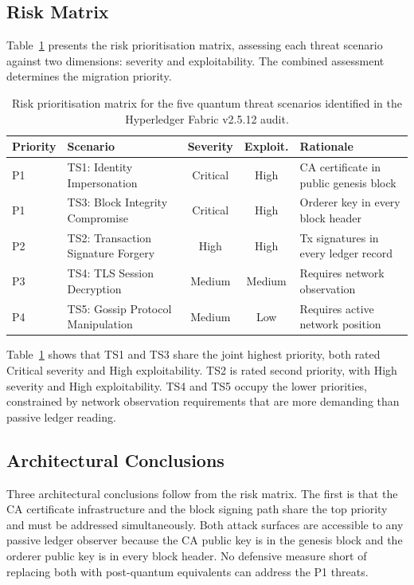 \documentclass[conference]{IEEEtran}
\begin{document}
\subsection{Risk Matrix}

Table~\ref{tab:risk_matrix} presents the risk prioritisation matrix,
assessing each threat scenario against two dimensions: severity and
exploitability. The combined assessment determines the migration priority.

\begin{table}[ht]
\centering
\caption{Risk prioritisation matrix for the five quantum threat scenarios
identified in the Hyperledger Fabric v2.5.12 audit.}
\label{tab:risk_matrix}
\setlength{\tabcolsep}{5pt}
\footnotesize
\begin{tabular}{@{}>{\raggedright\arraybackslash}p{1.6cm}>{\raggedright\arraybackslash}p{5.0cm}cc>{\raggedright\arraybackslash}p{3.5cm}@{}}
\toprule
\textbf{Priority} & \textbf{Scenario} & \textbf{Severity} &
\textbf{Exploit.} & \textbf{Rationale} \\
\midrule
P1 & TS1: Identity Impersonation & Critical & High &
  CA certificate in public genesis block \\
P1 & TS3: Block Integrity Compromise & Critical & High &
  Orderer key in every block header \\
P2 & TS2: Transaction Signature Forgery & High & High &
  Tx signatures in every ledger record \\
P3 & TS4: TLS Session Decryption & Medium & Medium &
  Requires network observation \\
P4 & TS5: Gossip Protocol Manipulation & Medium & Low &
  Requires active network position \\
\bottomrule
\end{tabular}
\end{table}

Table~\ref{tab:risk_matrix} shows that TS1 and TS3 share the joint
highest priority, both rated Critical severity and High exploitability.
TS2 is rated second priority, with High severity and High exploitability.
TS4 and TS5 occupy the lower priorities, constrained by network
observation requirements that are more demanding than passive ledger
reading.

\subsection{Architectural Conclusions}

Three architectural conclusions follow from the risk matrix. The first
is that the CA certificate infrastructure and the block signing path
share the top priority and must be addressed simultaneously. Both attack
surfaces are accessible to any passive ledger observer because the CA
public key is in the genesis block and the orderer public key is in every
block header. No defensive measure short of replacing both with
post-quantum equivalents can address the P1 threats.
\end{document}
